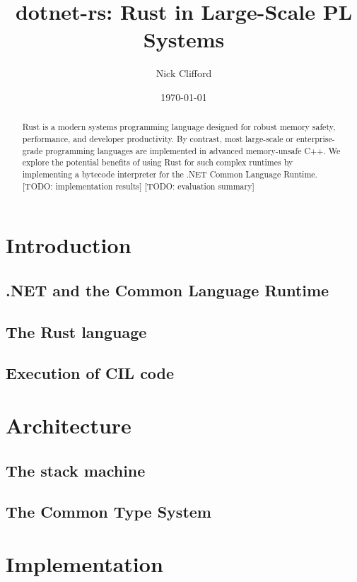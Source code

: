 \documentclass[12pt]{article}
\title{dotnet-rs: Rust in Large-Scale PL Systems}
\author{Nick Clifford}
\date{\today}
\begin{document}
    \maketitle

    \begin{abstract}
        Rust is a modern systems programming language designed for robust memory safety, performance, and developer productivity.
        By contrast, most large-scale or enterprise-grade programming languages are implemented in advanced memory-unsafe C++.
        We explore the potential benefits of using Rust for such complex runtimes by implementing a bytecode interpreter
        for the .NET Common Language Runtime.
        [TODO: implementation results] [TODO: evaluation summary]
    \end{abstract}
    
    \section{Introduction}

    \subsection{.NET and the Common Language Runtime}

    \subsection{The Rust language}

    \subsection{Execution of CIL code}

    \section{Architecture}
    
    \subsection{The stack machine}

    \subsection{The Common Type System}
    
    \section{Implementation}
    
\end{document}

